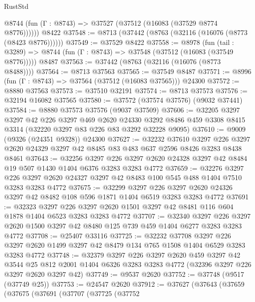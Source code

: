 \begin{lexlean}{RustStd}
\begin{coremodule}
      @8744 (fun (Γ : @8743) => @37527 (@37512 (@16083 (@37529 @8774 @8776))))))
    @8422
@37548 := @8713 (@37442 (@8763 (@32116 (@16076 (@8773 (@8423 @8776))))))
@37549 := @37529 @8422
@37558 := @8978
    (fun (tail : @3289) => @8744 (fun (Γ : @8743) => @37548 (@37512 (@16083 (@37549 @8776)))))
    @8487
@37563 := @37442 (@8763 (@32116 (@16076 (@8773 @8488))))
@37564 := @8713 @37563
@37565 := @37549 @8487
@37571 := @8996 (fun (Γ : @8743) => @37564 (@37512 (@16083 @37565))) @24300
@37572 := @8880 @37563
@37573 := @37510 @32191
@37574 := @8713 @37573
@37576 := @32194 @16082 @37565
@37580 := @37572 (@37574 @37576) (@9032 @37441)
@37584 := @8880 @37573 @37576 (@9037 @37509)
@37606 := @32205
    @3297
    @3297
    @42
    @226
    @3297
    @469
    @2620
    @24330
    @3292
    @8486
    @459
    @3308
    @8415
    @3314
    (@32220 @3297 @83 @226 @83 @3292 @32228 @9095)
@37610 := @9009 (@9326 (@24351 @9328)) @24300
@37627 := @32232
    @37610
    @3297
    @226
    @3297
    @2620
    @24329
    @3297
    @42
    @8485
    @83
    @483
    @637
    @2596
    @8426
    @3283
    @8438
    @8461
@37643 := @32256
    @3297
    @226
    @3297
    @2620
    @24328
    @3297
    @42
    @8484
    @19
    @507
    @1430
    @1404
    @6376
    @3283
    @3283
    @4772
@37659 := @32276
    @3297
    @226
    @3297
    @2620
    @24327
    @3297
    @42
    @8483
    @100
    @545
    @488
    @1404
    @7510
    @3283
    @3283
    @4772
@37675 := @32299
    @3297
    @226
    @3297
    @2620
    @24326
    @3297
    @42
    @8482
    @108
    @596
    @1871
    @1404
    @6519
    @3283
    @3283
    @4772
@37691 := @32323
    @3297
    @226
    @3297
    @2620
    @1501
    @3297
    @42
    @8481
    @116
    @604
    @1878
    @1404
    @6523
    @3283
    @3283
    @4772
@37707 := @32340
    @3297
    @226
    @3297
    @2620
    @1500
    @3297
    @42
    @8480
    @125
    @739
    @459
    @1404
    @6277
    @3283
    @3283
    @4772
@37708 := @25407 @33116
@37725 := @32232
    @37708
    @3297
    @226
    @3297
    @2620
    @1499
    @3297
    @42
    @8479
    @134
    @765
    @1508
    @1404
    @6529
    @3283
    @3283
    @4772
@37748 := @32379
    @3297
    @226
    @3297
    @2620
    @459
    @3297
    @42
    @3544
    @25
    @812
    @2001
    @1404
    @6326
    @3283
    @3283
    @4772
    (@32396 @3297 @226 @3297 @2620 @3297 @42)
@37749 := @9537 @2620
@37752 := @37748 (@9517 (@37749 @25))
@37753 := @24547 @2620
@37912 := @37627
    (@37643
      (@37659
        (@37675
          (@37691
            (@37707
              (@37725
                (@37752

\end{coremodule}
\end{lexlean}
